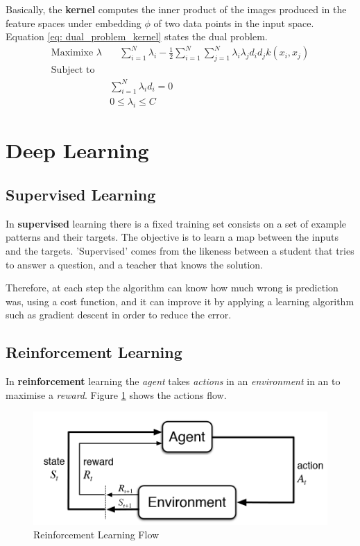 \documentclass[11pt]{article}
\begin{document}
Basically, the \textbf{kernel} computes the inner product of the images produced in the feature spaces under embedding $\phi$ of two data points in the input space. Equation \ref{eq: dual_problem_kernel} states the dual problem.
\begin{equation}
    \label{eq: dual_problem_kernel}
    \begin{aligned}
    \text{Maximixe } \lambda & \quad \sum^N_{i=1} \lambda_i - \frac{1}{2} \sum_{i=1}^N \sum_{j=1}^N \lambda_i \lambda_j d_i d_j k(x_i,x_j) \\
     \text{Subject to} & \\
           & \sum^N_{i=1} \lambda_i d_i = 0\quad \\
           & 0 \le \lambda_i \le C 
         \end{aligned}
    \end{equation}

\section{Deep Learning}
\subsection{Supervised Learning}
In \textbf{supervised} learning there is a fixed training set consists on a set of example patterns and their targets. The objective is to learn a map between the inputs and the targets. 'Supervised' comes from the likeness between a student that tries to answer a question, and a teacher that knows the solution.

Therefore, at each step the algorithm can know how much wrong is prediction was, using a cost function, and it can improve it by applying a learning algorithm such as gradient descent in order to reduce the error.

\subsection{Reinforcement Learning}
In \textbf{reinforcement} learning the \emph{agent} takes \emph{actions} in an \emph{environment} in an to maximise a \emph{reward}. Figure \ref{fig: reinforcement_flow} shows the actions flow.

\begin{figure}[h]
\centering
	\includegraphics[scale=0.5]{images/reinforcement}
	\caption{Reinforcement Learning Flow}
	\label{fig: reinforcement_flow}
\end{figure}
\end{document}
